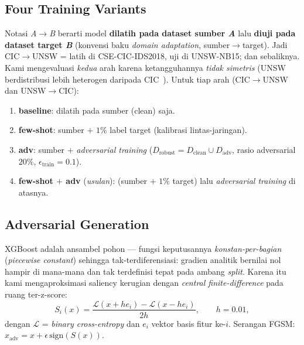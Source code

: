 \documentclass[11pt,a4paper]{article}
\begin{document}
\subsection{Four Training Variants}
Notasi \emph{A}$\rightarrow$\emph{B} berarti model \textbf{dilatih pada dataset
sumber \emph{A}} lalu \textbf{diuji pada dataset target \emph{B}} (konvensi baku
\emph{domain adaptation}, sumber$\rightarrow$target). Jadi CIC$\rightarrow$UNSW =
latih di CSE-CIC-IDS2018, uji di UNSW-NB15; dan sebaliknya. Kami mengevaluasi
\emph{kedua} arah karena ketangguhannya \emph{tidak simetris} (UNSW berdistribusi
lebih heterogen daripada CIC~\cite{martono2024sfm}). Untuk tiap arah (CIC$\rightarrow$UNSW dan
UNSW$\rightarrow$CIC):
\begin{enumerate}
  \item \textbf{baseline}: dilatih pada sumber (clean) saja.
  \item \textbf{few-shot}: sumber $+$ $1\%$ label target (kalibrasi lintas-jaringan).
  \item \textbf{adv}: sumber $+$ \emph{adversarial training}
  ($D_{\text{robust}} = D_{\text{clean}} \cup D_{\text{adv}}$, rasio adversarial
  $20\%$, $\epsilon_{\text{train}}=0.1$).
  \item \textbf{few-shot $+$ adv} (\emph{usulan}): (sumber $+$ $1\%$ target) lalu
  \emph{adversarial training} di atasnya.
\end{enumerate}

\subsection{Adversarial Generation}
\label{sec:saliency}
XGBoost adalah ansambel pohon --- fungsi keputusannya \emph{konstan-per-bagian}
(\emph{piecewise constant}) sehingga tak-terdiferensiasi: gradien analitik bernilai
nol hampir di mana-mana dan tak terdefinisi tepat pada ambang \emph{split}. Karena
itu kami mengaproksimasi saliency kerugian dengan \emph{central finite-difference}
pada ruang ter-z-score:
\begin{equation}
S_i(x) = \frac{\mathcal{L}(x + h e_i) - \mathcal{L}(x - h e_i)}{2h}, \qquad h=0.01,
\end{equation}
dengan $\mathcal{L}$ = \emph{binary cross-entropy} dan $e_i$ vektor basis fitur
ke-$i$. Serangan FGSM: $x_{\text{adv}} = x + \epsilon\,\mathrm{sign}(S(x))$.
\end{document}
